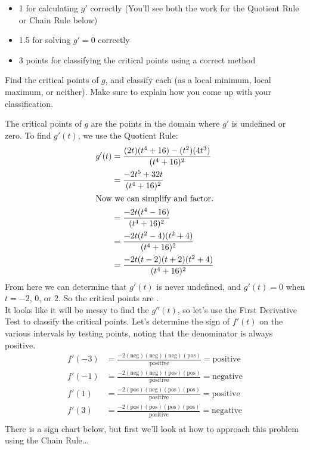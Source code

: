 \documentclass{article}
\begin{document}
\begin{enumerate}
\begin{enumerate}
    \begin{grading}
      \begin{itemize}[nosep]
      \item 1 for calculating $g'$ correctly (You'll see both the work for the Quotient Rule or Chain Rule below)
      \item 1.5 for solving $g' = 0$ correctly 
      \item 3 points for classifying the critical points using a correct method 
      \end{itemize}
    \end{grading}

    \begin{problem}[\stretch{3}]
      Find the critical points of $g$, and classify each (as a local minimum, local maximum, or neither). Make sure to explain how you come up with your classification. 
    \end{problem}

    \begin{solution}
      The critical points of $g$ are the points in the domain where $g'$ is
      undefined or zero. To find $g'(t)$, we use the Quotient Rule:
      \begin{align*}
        g'(t) &= \frac{(2t)(t^4+16)-(t^2)(4t^3)}{(t^4+16)^2} \\
        &= \frac{-2t^5+32t}{(t^4+16)^2} \\
        \intertext{Now we can simplify and factor.}
        &= \frac{-2t(t^4-16)}{(t^4+16)^2}\\
        &= \frac{-2t(t^2-4)(t^2+4)}{(t^4+16)^2} \\
        &= \frac{-2t(t-2)(t+2)(t^2+4)}{(t^4+16)^2}
      \end{align*}
      From here we can determine that $g'(t)$ is never undefined, and
      $g'(t)=0$ when $t=-2$, $0$, or $2$. So the critical points are
      .\\

      It looks like it will be messy to find the $g''(t)$,
      so let's use the First Derivative Test to classify the critical points.
      Let's determine the sign of $f'(t)$ on the various intervals by testing points,
      noting that the denominator is always positive.
      \begin{align*}
        f'(-3) &= \frac{-2(\text{neg})(\text{neg})(\text{neg})(\text{pos})}{\text{positive}}
          = \text{positive} \\
        f'(-1) &= \frac{-2(\text{neg})(\text{neg})(\text{pos})(\text{pos})}{\text{positive}}
          = \text{negative} \\
        f'(1) &= \frac{-2(\text{pos})(\text{neg})(\text{pos})(\text{pos})}{\text{positive}}
          = \text{positive} \\
        f'(3) &= \frac{-2(\text{pos})(\text{pos})(\text{pos})(\text{pos})}{\text{positive}}
          = \text{negative} \\
      \end{align*}
      There is a sign chart below, but first we'll look at how to approach this problem using the Chain Rule...


\end{solution}
\end{enumerate}
\end{enumerate}
\end{document}
